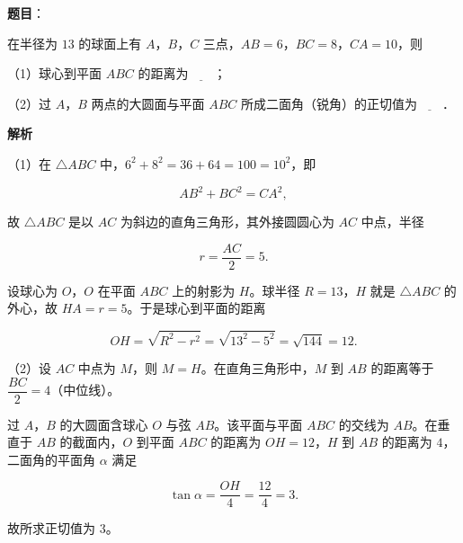 \begin{answer}

\textbf{题目}：

在半径为 $13$ 的球面上有 $A$，$B$，$C$ 三点，$AB=6$，$BC=8$，$CA=10$，则

（1）球心到平面 $ABC$ 的距离为$\underline{\qquad}$；

（2）过 $A$，$B$ 两点的大圆面与平面 $ABC$ 所成二面角（锐角）的正切值为$\underline{\qquad}$．

\textbf{解析}

（1）在 $\triangle ABC$ 中，$6^2+8^2=36+64=100=10^2$，即

\nopagebreak[4]
\[AB^2+BC^2=CA^2,\]

故 $\triangle ABC$ 是以 $AC$ 为斜边的直角三角形，其外接圆圆心为 $AC$ 中点，半径

\nopagebreak[4]
\[r=\frac{AC}2=5.\]

设球心为 $O$，$O$ 在平面 $ABC$ 上的射影为 $H$。球半径 $R=13$，$H$ 就是 $\triangle ABC$ 的外心，故 $HA=r=5$。于是球心到平面的距离

\nopagebreak[4]
\[OH=\sqrt{R^2-r^2}=\sqrt{13^2-5^2}=\sqrt{144}=12.\]

（2）设 $AC$ 中点为 $M$，则 $M=H$。在直角三角形中，$M$ 到 $AB$ 的距离等于 $\dfrac{BC}2=4$（中位线）。

过 $A$，$B$ 的大圆面含球心 $O$ 与弦 $AB$。该平面与平面 $ABC$ 的交线为 $AB$。在垂直于 $AB$ 的截面内，$O$ 到平面 $ABC$ 的距离为 $OH=12$，$H$ 到 $AB$ 的距离为 $4$，二面角的平面角 $\alpha$ 满足

\nopagebreak[4]
\[\tan\alpha=\frac{OH}{4}=\frac{12}{4}=3.\]

故所求正切值为 $3$。


\end{answer}
